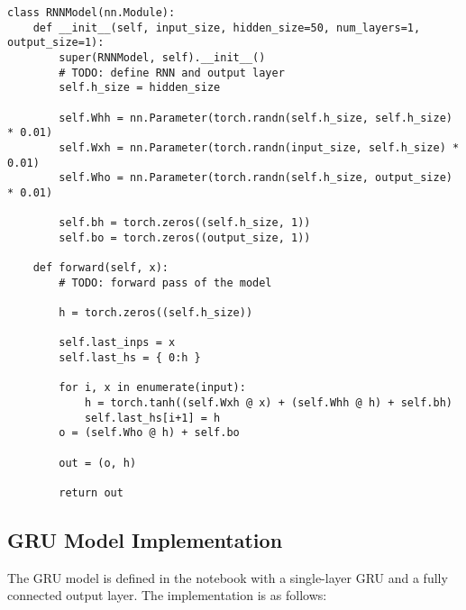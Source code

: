 \documentclass{article}
\begin{document}
\begin{lstlisting}
class RNNModel(nn.Module):
    def __init__(self, input_size, hidden_size=50, num_layers=1, output_size=1):
        super(RNNModel, self).__init__()
        # TODO: define RNN and output layer
        self.h_size = hidden_size
        
        self.Whh = nn.Parameter(torch.randn(self.h_size, self.h_size) * 0.01)
        self.Wxh = nn.Parameter(torch.randn(input_size, self.h_size) * 0.01)
        self.Who = nn.Parameter(torch.randn(self.h_size, output_size) * 0.01)
        
        self.bh = torch.zeros((self.h_size, 1))
        self.bo = torch.zeros((output_size, 1))
        
    def forward(self, x):
        # TODO: forward pass of the model
        
        h = torch.zeros((self.h_size))
        
        self.last_inps = x 
        self.last_hs = { 0:h }
        
        for i, x in enumerate(input):
            h = torch.tanh((self.Wxh @ x) + (self.Whh @ h) + self.bh)
            self.last_hs[i+1] = h 
        o = (self.Who @ h) + self.bo
        
        out = (o, h)        
        
        return out
\end{lstlisting}

\subsection{GRU Model Implementation}
The GRU model is defined in the notebook with a single-layer GRU and a fully connected output layer. The implementation is as follows:
\end{document}
